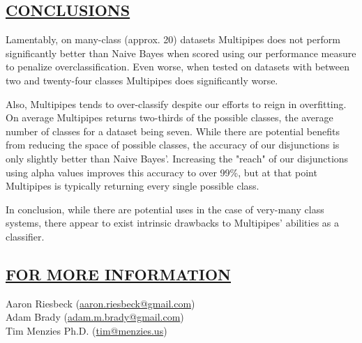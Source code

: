 \begin{kasten}
    \section*{ \hspace{0.1cm} {\color{red} \underline{CONCLUSIONS}}}
    \large{
Lamentably, on many-class (approx. 20) datasets Multipipes does not perform significantly better than Naive Bayes when scored using our performance measure to penalize overclassification. Even worse, when tested on datasets with between two and twenty-four classes Multipipes does significantly worse.

\vspace{3 mm}

Also, Multipipes tends to over-classify despite our efforts to reign in overfitting. On average Multipipes returns two-thirds of the possible classes, the average number of classes for a dataset being seven. While there are potential benefits from reducing the space of possible classes, the accuracy of our disjunctions is only slightly better than Naive Bayes'. Increasing the "reach" of our disjunctions using alpha values improves this accuracy to over 99\%, but at that point Multipipes is typically returning every single possible class.

\vspace{3 mm}

In conclusion, while there are potential uses in the case of very-many class systems, there appear to exist intrinsic drawbacks to Multipipes' abilities as a classifier.
    }
\end{kasten}

\begin{kasten}
    \section*{ \hspace{0.1cm} {\color{red} \underline{FOR MORE INFORMATION}}}
    \vspace{-0.5em}
    \normalsize{
      Aaron Riesbeck (\url{aaron.riesbeck@gmail.com})\\
      Adam Brady (\url{adam.m.brady@gmail.com})\\
      Tim Menzies Ph.D. (\url{tim@menzies.us})\\
    }
    \vspace{-0.5em}
\end{kasten}

